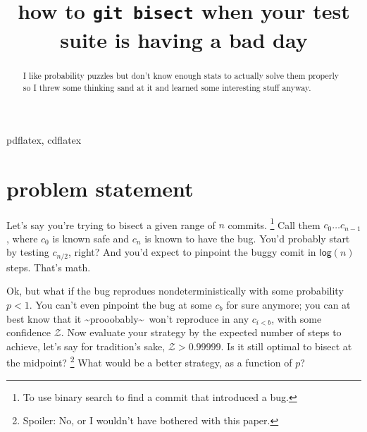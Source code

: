 \documentclass[11pt]{sigplanconf}
\begin{document}
\copyrightdata{}

\title{
how to \texttt{git bisect} when your test suite is having a bad day
}


\maketitle

\begin{abstract}
	I like probability puzzles but don't know enough stats to actually solve them properly
	so I threw some thinking sand at it and learned some interesting stuff anyway.
\end{abstract}


\keywords pdflatex, cdflatex

\newcommand\confidents{\ensuremath{\mathcal{Z}}\xspace}
\newcommand\pdf{\ensuremath{\mathsf{pdf}}\xspace}
\newcommand\cdf{\ensuremath{\mathsf{cdf}}\xspace}

\section{problem statement}

Let's say you're trying to bisect
a given range of $n$ commits.%
\footnote{To use binary search to find a commit that introduced a bug.}
Call them $c_0 \dots c_{n-1}$, where $c_0$ is known safe and $c_n$ is known to have the bug.
You'd probably start by testing $c_{n/2}$, right?
And you'd expect to pinpoint the buggy comit in $\mathsf{log} (n)$ steps.
That's math.

Ok, but what if the bug reprodues nondeterministically with some probability $p<1$.
You can't even pinpoint the bug at some $c_{b}$ for sure anymore;
you can at best know
that it \textasciitilde{}prooobably\textasciitilde~won't reproduce in any $c_{i<b}$,
with some confidence $\confidents$.
Now evaluate your strategy by the expected number of steps to achieve, let's say for tradition's sake, $\confidents > 0.99999$.
Is it still optimal to bisect at the midpoint?%
\footnote{Spoiler: No, or I wouldn't have bothered with this paper.}
What would be a better strategy, as a function of $p$?
\end{document}
